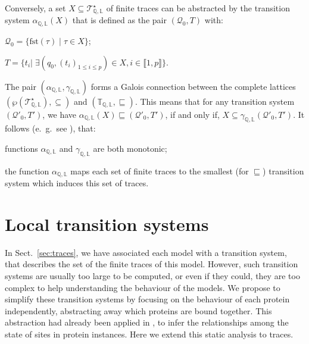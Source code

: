 \documentclass[10pt,a4paper]{llncs}
\newcommand{\states}{\mathbb{Q}}
\newcommand{\labels}{\mathbb{L}}
\newcommand{\eg}{e.~g.}
\newcommand{\init}[1][\tau]{\textrm{fst}(#1)}
\newcommand{\transitionsystemprim}{(\mathcal{Q}'_0,T')}
\newcommand{\transitionsystems}[1][\states,\labels]{\mathbb{T}_{#1}}
\newcommand{\traces}[1][\states,\labels]{\mathcal{T}^{\star}_{#1}}
\newcommand{\gammatransitionsystem}[1][\states,\labels]{\gamma_{#1}}
\newcommand{\alphatransitionsystem}[1][\states,\labels]{\alpha_{#1}}
\newcommand{\beforesection}{\vspace*{-4pt}}
\renewcommand{\beforesection}{}
\begin{document}
Conversely, a set $X\subseteq \traces$ of finite traces can be abstracted by the transition system
$\alphatransitionsystem(X)$ that is defined as the pair $(\mathcal{Q}_0,T)$ with:
\begin{inparaenum}
\item $\mathcal{Q}_0=\{\init\;|\;\tau\in X\}$;
\item $T = \{t_i|\;\exists (q_0,(t_i)_{1\leq i \leq p})\in X, i\in \llbracket 1,p \rrbracket\}$.
\end{inparaenum} The pair $(\alphatransitionsystem,\gammatransitionsystem)$ forms a Galois connection between
the complete lattices  $(\wp(\traces),\subseteq)$ and
 $(\transitionsystems,\sqsubseteq)$.
This means that for %
 any transition system $\transitionsystemprim$, we have
$\alphatransitionsystem(X)\sqsubseteq \transitionsystemprim$, if and only if,
$X\subseteq \gammatransitionsystem\transitionsystemprim$.
It follows (\eg~see \cite{Cousot1979}), that: \begin{inparaenum}\item functions $\alphatransitionsystem$ and $\gammatransitionsystem$ are both monotonic;
\item the function $\alphatransitionsystem$ maps each set of finite traces to the smallest (for $\sqsubseteq$) transition system which induces this set of traces. %
\end{inparaenum}

\beforesection

\section{Local transition systems}
\label{sec:localtraces}

\beforesection

In Sect.~\ref{sec:traces}, we have associated each model  with a transition system, that describes the set of the finite traces of this model. However, such transition systems are  usually too large to be computed, or even if they could, they are too complex to help understanding the behaviour of the models.
We propose to simplify these transition systems by focusing on the behaviour of each protein independently, abstracting away  which proteins  are bound together. This abstraction had already been applied in \cite{Feret-ICCMSE2007,DanosEtAl-VMCAI08}, to infer the relationships among the state of sites in protein instances. Here we extend this static analysis to traces.
\end{document}
